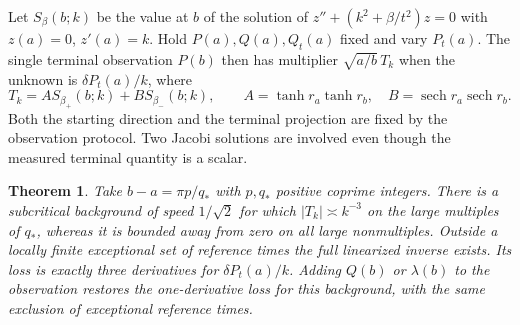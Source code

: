 \documentclass[11pt]{article}
\newtheorem{theorem}{Theorem}
\newcommand{\sech}{\operatorname{sech}}
\begin{document}
Let $S_\beta(b;k)$ be the value at $b$ of the solution of
$z''+(k^2+\beta/t^2)z=0$ with $z(a)=0$, $z'(a)=k$.
Hold $P(a),Q(a),Q_t(a)$ fixed and vary $P_t(a)$.
The single terminal observation $P(b)$ then has multiplier
$\sqrt{a/b}\,T_k$ when the unknown is $\delta P_t(a)/k$, where
\begin{equation}
 T_k=A S_{\beta_+}(b;k)+B S_{\beta_-}(b;k),\qquad
 A=\tanh r_a\tanh r_b,\quad B=\sech r_a\sech r_b .
 \label{mix}
\end{equation}
Both the starting direction and the terminal projection are
fixed by the observation protocol. Two Jacobi solutions are involved
even though the measured terminal quantity is a scalar.

\begin{theorem}
\label{th:fourier}
Take $b-a=\pi p/q_*$ with $p,q_*$ positive coprime integers.
There is a subcritical background of speed $1/\sqrt2$
for which $|T_k|\asymp k^{-3}$ on the large multiples of $q_*$,
whereas it is bounded away from zero on all large nonmultiples.
Outside a locally finite exceptional set of reference times
the full linearized inverse exists. Its loss is exactly
three derivatives for $\delta P_t(a)/k$.
Adding $Q(b)$ or $\lambda(b)$ to the observation restores the
one-derivative loss for this background, with the same exclusion
of exceptional reference times.
\end{theorem}
\end{document}
